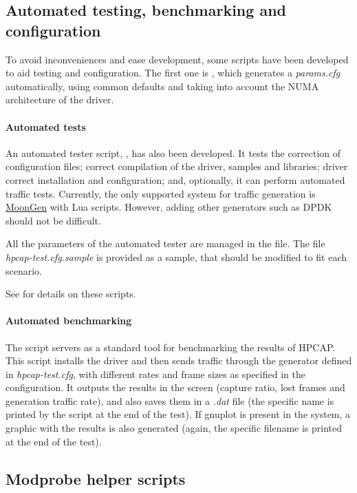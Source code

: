 \documentclass[oneside]{hpman}
\begin{document}
\subsection{Automated testing, benchmarking and configuration}

To avoid inconveniences and ease development, some scripts have been developed to aid testing and configuration. The first one is , which generates a \textit{params.cfg} automatically, using common defaults and taking into account the NUMA architecture of the driver.

\paragraph{Automated tests} An automated tester script, , has also been developed. It tests the correction of configuration files; correct compilation of the driver, samples and libraries; driver correct installation and configuration; and, optionally, it can perform automated traffic tests. Currently, the only supported system for traffic generation is \href{https://github.com/emmericp/MoonGen}{MoonGen} with Lua scripts. However, adding other generators such as DPDK should not be difficult.

All the parameters of the automated tester are managed in the  file. The file \textit{hpcap-test.cfg.sample} is provided as a sample, that should be modified to fit each scenario.

See  for details on these scripts.

\paragraph{Automated benchmarking} The script  servers as a standard tool for benchmarking the results of HPCAP. This script installs the driver and then sends traffic through the generator defined in \textit{hpcap-test.cfg}, with different rates and frame sizes as specified in the configuration. It outputs the results in the screen (capture ratio, lost frames and generation traffic rate), and also saves them in a \textit{.dat} file (the specific name is printed by the script at the end of the test). If gnuplot is present in the system, a graphic with the results is also generated (again, the specific filename is printed at the end of the test).

\subsection{Modprobe helper scripts}
\label{sec:scripts:modprobe}
\end{document}
